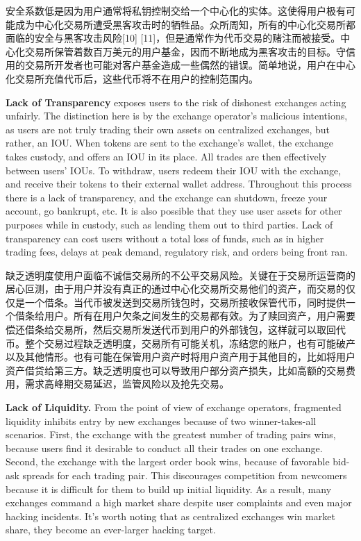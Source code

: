 \documentclass[UTF8,nofonts]{ctexart}
\begin{document}
\begin{multicols}{2}
安全系数低是因为用户通常将私钥控制交给一个中心化的实体。这使得用户极有可能成为中心化交易所遭受黑客攻击时的牺牲品。众所周知，所有的中心化交易所都面临的安全与黑客攻击风险[10] [11]，但是通常作为代币交易的赌注而被接受。中心化交易所保管着数百万美元的用户基金，因而不断地成为黑客攻击的目标。守信用的交易所开发者也可能对客户基金造成一些偶然的错误。简单地说，用户在中心化交易所充值代币后，这些代币将不在用户的控制范围内。


\textbf{Lack of Transparency} exposes users to the risk of dishonest exchanges acting unfairly. The distinction here is by the exchange operator's malicious intentions, as users are not truly trading their own assets on centralized exchanges, but rather, an IOU. When tokens are sent to the exchange's wallet, the exchange takes custody, and offers an IOU in its place. All trades are then effectively between users' IOUs. To withdraw, users redeem their IOU with the exchange, and receive their tokens to their external wallet address. Throughout this process there is a lack of transparency, and the exchange can shutdown, freeze your account, go bankrupt, etc. It is also possible that they use user assets for other purposes while in custody, such as lending them out to third parties. Lack of transparency can cost users without a total loss of funds, such as in higher trading fees, delays at peak demand, regulatory risk, and orders being front ran.

缺乏透明度使用户面临不诚信交易所的不公平交易风险。关键在于交易所运营商的居心叵测，由于用户并没有真正的通过中心化交易所交易他们的资产，而交易的仅仅是一个借条。当代币被发送到交易所钱包时，交易所接收保管代币，同时提供一个借条给用户。所有在用户欠条之间发生的交易都有效。为了赎回资产，用户需要偿还借条给交易所，然后交易所发送代币到用户的外部钱包，这样就可以取回代币。整个交易过程缺乏透明度，交易所有可能关机，冻结您的账户，也有可能破产以及其他情形。也有可能在保管用户资产时将用户资产用于其他目的，比如将用户资产借贷给第三方。缺乏透明度也可以导致用户部分资产损失，比如高额的交易费用，需求高峰期交易延迟，监管风险以及抢先交易。


\textbf{Lack of Liquidity.} From the point of view of exchange operators, fragmented liquidity inhibits entry by new exchanges because of two winner-takes-all scenarios. First, the exchange with the greatest number of trading pairs wins, because users find it desirable to conduct all their trades on one exchange. Second, the exchange with the largest order book wins, because of favorable bid-ask spreads for each trading pair. This discourages competition from newcomers because it is difficult for them to build up initial liquidity. As a result, many exchanges command a high market share despite user complaints and even major hacking incidents. It's worth noting that as centralized exchanges win market share, they become an ever-larger hacking target.


\end{multicols}
\end{document}
